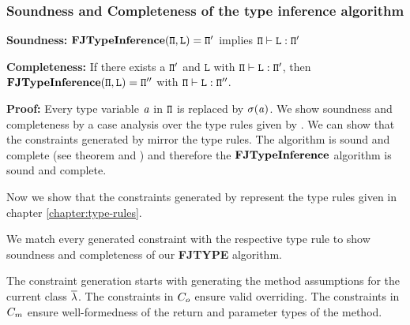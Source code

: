 \documentclass[a4paper,USenglish,cleveref, autoref, thm-restate, anonymous]{lipics-v2021}
\begin{document}
\subsubsection{Soundness and Completeness of the type inference algorithm}
\begin{theorem}\textbf{Soundness:}
  $\textbf{FJTypeInference}({\tt \Pi},\texttt{L}) = {\tt \Pi}'$ implies ${\tt \Pi} \vdash \texttt{L} : {\tt \Pi}'$
\end{theorem}
\begin{theorem}\textbf{Completeness:}
  If there exists a ${\tt \Pi}'$ and $\texttt{L}$ with ${\tt \Pi} \vdash \texttt{L} : {\tt \Pi}'$, then $\textbf{FJTypeInference}({\tt \Pi},\texttt{L}) = {\tt \Pi}''$ with ${\tt \Pi} \vdash \texttt{L} : {\tt \Pi}''$.
\end{theorem}
\textbf{Proof:}
Every type variable $\mathit{ a }$ in ${\tt \Pi}$ is replaced by $\sigma(\mathit{ a })$.
We show soundness and completeness by a case analysis over the type rules given by \TFGJ{}.
We can show that the constraints generated by \fjtype{} mirror the \TFGJ{} type rules.
The \unify{} algorithm is sound and complete (see theorem \label{theo:unifySoundness} and \label{theo:unifyCompleteness})
and therefore the $\textbf{FJTypeInference}$ algorithm is sound and complete.

Now we show that the constraints generated by \unify{}
represent the type rules given in chapter \ref{chapter:type-rules}.



We match every generated constraint with the respective type rule to show soundness and completeness of our \textbf{FJTYPE} algorithm.

The constraint generation starts with generating the method assumptions for the current class $\overline{\mathtt{\lambda}}$.
The constraints in $C_o$ ensure valid overriding.
The constraints in $C_m$ ensure well-formedness of the return and parameter types of the method.
\end{document}
